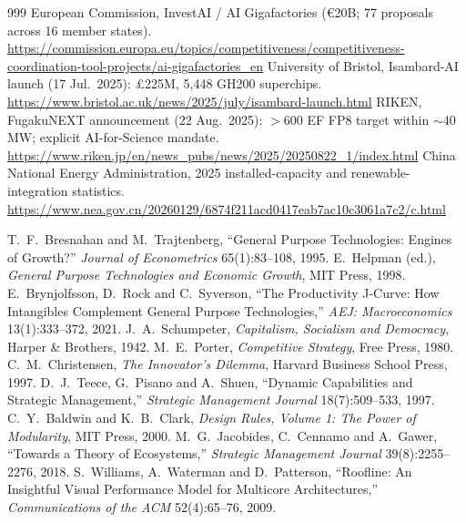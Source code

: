 \begin{thebibliography}{999}
 European Commission, InvestAI / AI Gigafactories (€20B; 77 proposals across 16 member states). \url{https://commission.europa.eu/topics/competitiveness/competitiveness-coordination-tool-projects/ai-gigafactories_en}
 University of Bristol, Isambard-AI launch (17 Jul.\ 2025): £225M, 5,448 GH200 superchips. \url{https://www.bristol.ac.uk/news/2025/july/isambard-launch.html}
 RIKEN, FugakuNEXT announcement (22 Aug.\ 2025): $>$600 EF FP8 target within $\sim$40\,MW; explicit AI-for-Science mandate. \url{https://www.riken.jp/en/news_pubs/news/2025/20250822_1/index.html}
 China National Energy Administration, 2025 installed-capacity and renewable-integration statistics. \url{https://www.nea.gov.cn/20260129/6874f211acd0417eab7ac10c3061a7c2/c.html}

 T.~F.~Bresnahan and M.~Trajtenberg, ``General Purpose Technologies: Engines of Growth?'' \emph{Journal of Econometrics} 65(1):83--108, 1995.
 E.~Helpman (ed.), \emph{General Purpose Technologies and Economic Growth}, MIT Press, 1998.
 E.~Brynjolfsson, D.~Rock and C.~Syverson, ``The Productivity J-Curve: How Intangibles Complement General Purpose Technologies,'' \emph{AEJ: Macroeconomics} 13(1):333--372, 2021.
 J.~A.~Schumpeter, \emph{Capitalism, Socialism and Democracy}, Harper \& Brothers, 1942.
 M.~E.~Porter, \emph{Competitive Strategy}, Free Press, 1980.
 C.~M.~Christensen, \emph{The Innovator's Dilemma}, Harvard Business School Press, 1997.
 D.~J.~Teece, G.~Pisano and A.~Shuen, ``Dynamic Capabilities and Strategic Management,'' \emph{Strategic Management Journal} 18(7):509--533, 1997.
 C.~Y.~Baldwin and K.~B.~Clark, \emph{Design Rules, Volume 1: The Power of Modularity}, MIT Press, 2000.
 M.~G.~Jacobides, C.~Cennamo and A.~Gawer, ``Towards a Theory of Ecosystems,'' \emph{Strategic Management Journal} 39(8):2255--2276, 2018.
 S.~Williams, A.~Waterman and D.~Patterson, ``Roofline: An Insightful Visual Performance Model for Multicore Architectures,'' \emph{Communications of the ACM} 52(4):65--76, 2009.


\end{thebibliography}
